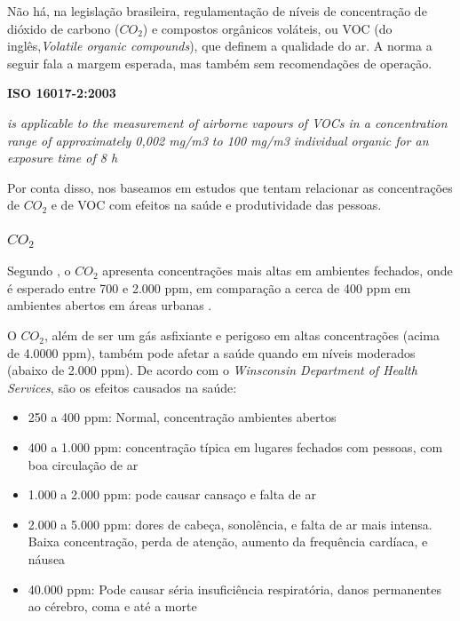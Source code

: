 \documentclass[../monografia.tex]{subfiles}
\begin{document}
Não há, na legislação brasileira, regulamentação de níveis de concentração de dióxido de carbono ($CO_{2}$) e compostos orgânicos voláteis, ou VOC (do inglês,\textit{Volatile organic compounds}), que definem a qualidade do ar. A norma a seguir fala a margem esperada, mas também sem recomendações de operação.

\begin{citacaoLonga} %
\textbf{ISO 16017-2:2003}

\textit{is applicable to the measurement of airborne vapours of VOCs in a concentration range of approximately 0,002 mg/m3 to 100 mg/m3 individual organic for an exposure time of 8 h}
\end{citacaoLonga}

Por conta disso, nos baseamos em estudos que tentam relacionar as concentrações de $CO_{2}$ e de VOC com efeitos na saúde e produtividade das pessoas. 

\subsubsection{$CO_{2}$}
Segundo \cite{AirQuality}, o $CO_{2}$ apresenta concentrações mais altas em ambientes fechados, onde é esperado entre 700 e 2.000 ppm, em comparação a cerca de 400 ppm em ambientes abertos em áreas urbanas \cite{co2Earth}. 

O $CO_{2}$, além de ser um gás asfixiante e perigoso em altas concentrações (acima de 4.0000 ppm), também pode afetar a saúde quando em níveis moderados (abaixo de 2.000 ppm). 
De acordo com o \textit{Winsconsin Department of Health Services}\cite{Winsconsin}, são os efeitos causados na saúde: 
\begin{itemize}
\item 250 a 400 ppm: Normal, concentração ambientes abertos
\item 400 a 1.000 ppm: concentração típica em lugares fechados com pessoas, com boa circulação de ar
\item 1.000 a 2.000 ppm: pode causar cansaço e falta de ar
\item 2.000 a 5.000 ppm: dores de cabeça, sonolência, e falta de ar mais intensa. Baixa concentração, perda de atenção, aumento da frequência cardíaca, e náusea
\item 40.000 ppm: Pode causar séria insuficiência respiratória, danos permanentes ao cérebro, coma e até a morte
\end{itemize}
\end{document}
